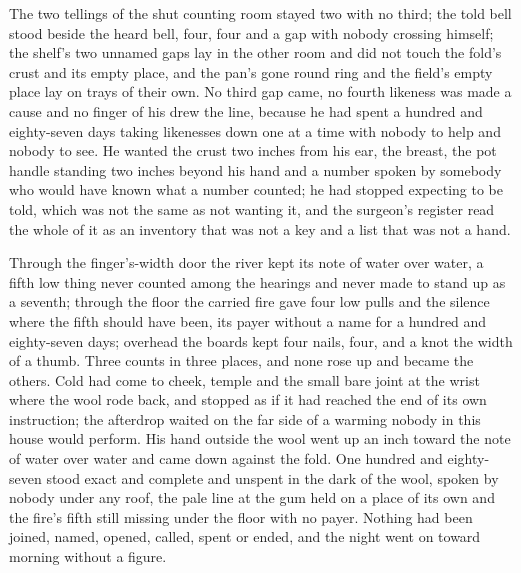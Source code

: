 The two tellings of the shut counting room stayed two with no third; the told bell stood beside the heard bell, four, four and a gap with nobody crossing himself; the shelf's two unnamed gaps lay in the other room and did not touch the fold's crust and its empty place, and the pan's gone round ring and the field's empty place lay on trays of their own. No third gap came, no fourth likeness was made a cause and no finger of his drew the line, because he had spent a hundred and eighty-seven days taking likenesses down one at a time with nobody to help and nobody to see. He wanted the crust two inches from his ear, the breast, the pot handle standing two inches beyond his hand and a number spoken by somebody who would have known what a number counted; he had stopped expecting to be told, which was not the same as not wanting it, and the surgeon's register read the whole of it as an inventory that was not a key and a list that was not a hand.

Through the finger's-width door the river kept its note of water over water, a fifth low thing never counted among the hearings and never made to stand up as a seventh; through the floor the carried fire gave four low pulls and the silence where the fifth should have been, its payer without a name for a hundred and eighty-seven days; overhead the boards kept four nails, four, and a knot the width of a thumb. Three counts in three places, and none rose up and became the others. Cold had come to cheek, temple and the small bare joint at the wrist where the wool rode back, and stopped as if it had reached the end of its own instruction; the afterdrop waited on the far side of a warming nobody in this house would perform. His hand outside the wool went up an inch toward the note of water over water and came down against the fold. One hundred and eighty-seven stood exact and complete and unspent in the dark of the wool, spoken by nobody under any roof, the pale line at the gum held on a place of its own and the fire's fifth still missing under the floor with no payer. Nothing had been joined, named, opened, called, spent or ended, and the night went on toward morning without a figure.
